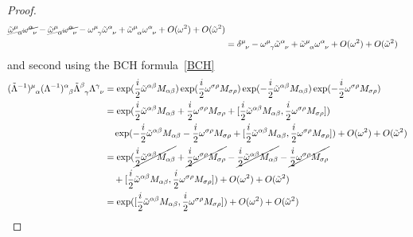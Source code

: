 \begin{proof}
\begin{equation*}
\begin{aligned}
\cancel{\tilde \omega^{\mu}_{\phantom \mu \alpha} \omega^{\alpha}_{\phantom \alpha \nu}} - \cancel{\tilde \omega^{\mu}_{\phantom \mu \alpha} \omega^{\alpha}_{\phantom \alpha \nu}} - \omega^{\mu}_{\phantom \mu \gamma} \tilde \omega^{\alpha}_{\phantom \alpha \nu} + \tilde \omega^{\mu}_{\phantom \mu \alpha} \omega^{\alpha}_{\phantom \alpha \nu} + O(\omega^2) + O(\tilde \omega^2) \\ & = \delta^{\mu}_{\phantom \mu \nu} - \omega^{\mu}_{\phantom \mu \gamma} \tilde \omega^{\alpha}_{\phantom \alpha \nu} + \tilde \omega^{\mu}_{\phantom \mu \alpha} \omega^{\alpha}_{\phantom \alpha \nu} + O(\omega^2) + O(\tilde \omega^2)
        \end{aligned}
        \end{equation*}
        and second using the BCH formula~\eqref{BCH}
        \begin{equation*}
        \begin{aligned}
            (\tilde \Lambda^{-1})^{\mu}_{\phantom \mu \alpha} (\Lambda^{-1})^{\alpha}_{\phantom \alpha \beta} \tilde \Lambda^{\beta}_{\phantom \beta \gamma} \Lambda^{\gamma}_{\phantom \gamma \nu} & = \exp(\frac{i}{2} \tilde \omega^{\alpha \beta} M_{\alpha \beta}) \exp(\frac{i}{2} \omega^{\sigma \rho} M_{\sigma \rho}) \exp(- \frac{i}{2} \tilde \omega^{\alpha \beta} M_{\alpha \beta}) \exp(- \frac{i}{2} \omega^{\sigma \rho} M_{\sigma \rho}) \\ & = \exp(\frac{i}{2} \tilde \omega^{\alpha \beta} M_{\alpha \beta} + \frac{i}{2} \omega^{\sigma \rho} M_{\sigma \rho} + [\frac{i}{2} \tilde \omega^{\alpha \beta} M_{\alpha \beta}, \frac{i}{2} \omega^{\sigma \rho} M_{\sigma \rho}]) \\ & \quad \exp(- \frac{i}{2} \tilde \omega^{\alpha \beta} M_{\alpha \beta} - \frac{i}{2} \omega^{\sigma \rho} M_{\sigma \rho} + [\frac{i}{2} \tilde \omega^{\alpha \beta} M_{\alpha \beta}, \frac{i}{2} \omega^{\sigma \rho} M_{\sigma \rho}]) + O(\omega^2) + O(\tilde \omega^2) \\ & =  \exp(\cancel{\frac{i}{2} \tilde \omega^{\alpha \beta} M_{\alpha \beta}} + \cancel{\frac{i}{2} \omega^{\sigma \rho} M_{\sigma \rho}} - \cancel{\frac{i}{2} \tilde \omega^{\alpha \beta} M_{\alpha \beta}} - \cancel{\frac{i}{2} \omega^{\sigma \rho} M_{\sigma \rho}} \\ & \quad + [\frac{i}{2} \tilde \omega^{\alpha \beta} M_{\alpha \beta}, \frac{i}{2} \omega^{\sigma \rho} M_{\sigma \rho}]) + O(\omega^2) + O(\tilde \omega^2) \\ & = \exp([\frac{i}{2} \tilde \omega^{\alpha \beta} M_{\alpha \beta}, \frac{i}{2} \omega^{\sigma \rho} M_{\sigma \rho}]) + O(\omega^2) + O(\tilde \omega^2)

\end{aligned}
\end{equation*}
\end{proof}
